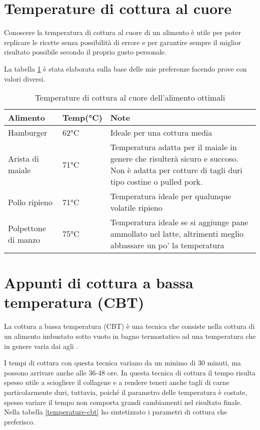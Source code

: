\section{Temperature di cottura al cuore}
Conoscere la temperatura di cottura al cuore di un alimento è utile per poter replicare le ricette senza possibilità di errore e per garantire sempre il miglior risultato possibile secondo il proprio gusto personale.

La tabella \ref{temperature-al-cuore} è stata elaborata sulla base delle mie preferenze facendo prove con valori diversi.



\begin{table}
\begin{tabular}{llp{}}
\toprule
Alimento				&	Temp(°C)		&		Note		\\
\midrule
Hamburger			& 	62°C 		& Ideale per una cottura media\\
Arista di maiale	& 	71°C 		& Temperatura adatta per il maiale in genere che risulterà sicuro e succoso. Non è adatta per cotture di tagli duri tipo costine o pulled pork. \\
Pollo ripieno 		& 	71°C 		& Temperatura ideale per qualunque volatile ripieno\\
Polpettone di manzo	&	75°C 		& Temperatura ideale se si aggiunge pane ammollato nel latte, altrimenti meglio abbassare un po' la temperatura\\
\bottomrule
\end{tabular}
\label{temperature-al-cuore}
\caption{Temperature di cottura al cuore dell'alimento ottimali}
\end{table}

\section{Appunti di cottura a bassa temperatura (CBT)}
La cottura a bassa temperatura (CBT) è una tecnica che consiste nella cottura di un alimento imbustato sotto vuoto in bagno termostatico ad una temperatura che in genere varia dai  agli .

I tempi di cottura con questa tecnica variano da un minimo di 30 minuti, ma possono arrivare anche alle 36-48 ore. In questa tecnica di cottura il tempo risulta spesso utile a sciogliere il collagene e a rendere teneri anche tagli di carne particolarmente duri, tuttavia, poiché il parametro delle temperatura è costate, spesso variare il tempo non comporta grandi cambiamenti nel risultato finale. Nella tabella \ref{temperature-cbt} ho sintetizzato i parametri di cottura che preferisco.

